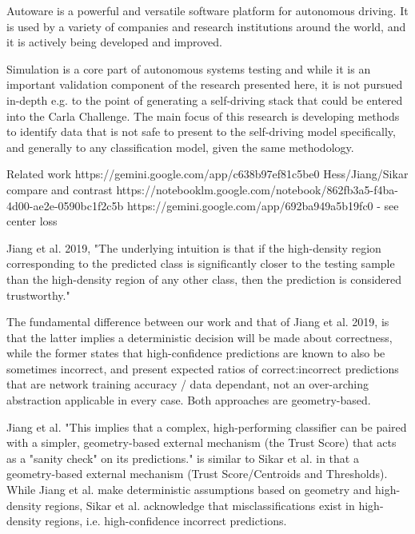 Autoware is a powerful and versatile software platform for autonomous driving. It is used by a variety of companies and research institutions around the world, and it is actively being developed and improved.


Simulation is a core part of autonomous systems testing and while it is an important validation component of the research presented here, it is not pursued in-depth e.g. to the point of generating a self-driving stack that could be entered into the Carla Challenge. The main focus of this research is developing methods to identify data that is not safe to present to the self-driving model specifically, and generally to any classification model, given the same methodology.



Related work
https://gemini.google.com/app/c638b97ef81c5be0 Hess/Jiang/Sikar compare and contrast
https://notebooklm.google.com/notebook/862fb3a5-f4ba-4d00-ae2e-0590bc1f2c5b
https://gemini.google.com/app/692ba949a5b19fc0 - see center loss

Jiang et al. 2019, "The underlying intuition is that if the high-density region corresponding to the predicted class is significantly closer to the testing sample than the high-density region of any other class, then the prediction is considered trustworthy."

The fundamental difference between our work and that of Jiang et al. 2019, is that the latter implies a deterministic decision will be made about correctness, while the former states that high-confidence predictions are known to also be sometimes incorrect, and present expected ratios of correct:incorrect predictions that are network training accuracy / data dependant, not an over-arching abstraction applicable in every case. Both approaches are geometry-based.

Jiang et al. "This implies that a complex, high-performing classifier can be paired with a simpler, geometry-based external mechanism (the Trust Score) that acts as a "sanity check" on its predictions." is similar to Sikar et al. in that a geometry-based external mechanism (Trust Score/Centroids and Thresholds). While Jiang et al. make deterministic assumptions based on geometry and high-density regions, Sikar et al. acknowledge that misclassifications exist in high-density regions, i.e. high-confidence incorrect predictions. 

